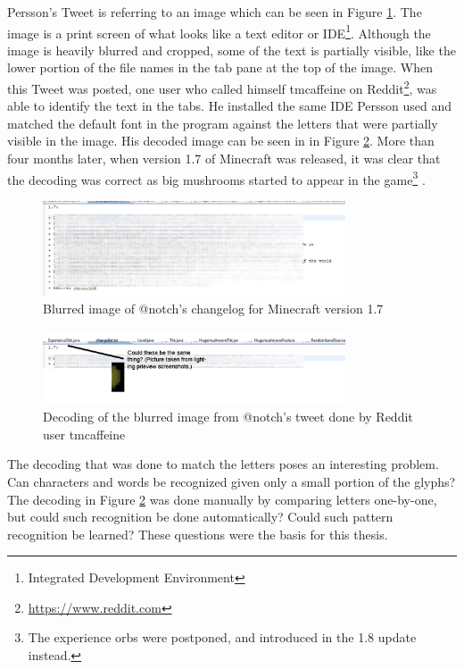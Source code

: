 Persson's Tweet is referring to an image which can be seen in Figure \ref{fig:notch_imgur}. The image is a print screen of what looks like a text editor or IDE\footnote{Integrated Development Environment}. Although the image is heavily blurred and cropped, some of the text is partially visible, like the lower portion of the file names in the tab pane at the top of the image. When this Tweet was posted, one user who called himself tmcaffeine on Reddit\footnote{\url{https://www.reddit.com}}, was able to identify the text in the tabs. He installed the same IDE Persson used and matched the default font in the program against the letters that were partially visible in the image. His decoded image can be seen in in Figure \ref{fig:notch_eclipse_decoded}. More than four months later, when version 1.7 of Minecraft was released, it was clear that the decoding was correct as big mushrooms started to appear in the game\footnote{The experience orbs were postponed, and introduced in the 1.8 update instead.} \citep{misc-minecraft.172-changelog}.

\begin{figure}[h]
    \centering
    \includegraphics[width=0.8\textwidth]{fig/chapter1/notch_eclipse.jpg}
    \caption{Blurred image of @notch's changelog for Minecraft version 1.7}
    \label{fig:notch_imgur}
\end{figure}

\begin{figure}[ht]
    \centering
    \includegraphics[width=0.8\textwidth]{fig/chapter1/notch_eclipse_decoded.jpg}
    \captionsetup{justification=centering}
    \caption{Decoding of the blurred image from @notch's tweet done by Reddit user tmcaffeine}
    \label{fig:notch_eclipse_decoded}
\end{figure}

The decoding that was done to match the letters poses an interesting problem. Can characters and words be recognized given only a small portion of the glyphs? The decoding in Figure \ref{fig:notch_eclipse_decoded} was done manually by comparing letters one-by-one, but could such recognition be done automatically? Could such pattern recognition be learned? These questions were the basis for this thesis.

